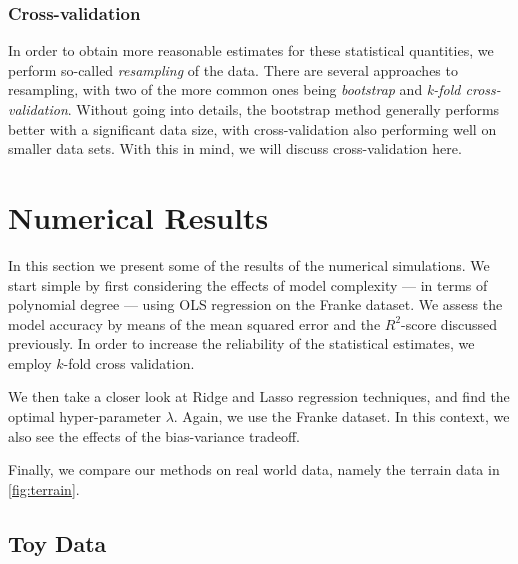 \documentclass[dvipsnames, article, a4paper, oneside, 12pt]{memoir}
\begin{document}
  \subsection{Cross-validation}

  In order to obtain more reasonable estimates for these statistical
  quantities, we perform so-called \emph{resampling} of the data. There are
  several approaches to resampling, with two of the more common ones being
  \emph{bootstrap} and \emph{k-fold cross-validation}. Without going into
  details, the bootstrap method generally performs better with a significant
  data size, with cross-validation also performing well on smaller data sets.
  With this in mind, we will discuss cross-validation here.
  
  
  \chapter{Numerical Results}

  In this section we present some of the results of the numerical simulations.
  We start simple by first considering the effects of model complexity --- in
  terms of polynomial degree --- using OLS regression on the Franke dataset. We
  assess the model accuracy by means of the mean squared error and the \(
  R^2\)-score discussed previously. In order to increase the reliability of the
  statistical estimates, we employ \( k\)-fold cross validation.

  We then take a closer look at Ridge and Lasso regression techniques, and find
  the optimal hyper-parameter \( \lambda \). Again, we use the Franke dataset.
  In this context, we also see the effects of the bias-variance tradeoff.

  Finally, we compare our methods on real world data, namely the terrain data
  in \cref{fig:terrain}.
  
  \section{Toy Data}
  
\end{document}
